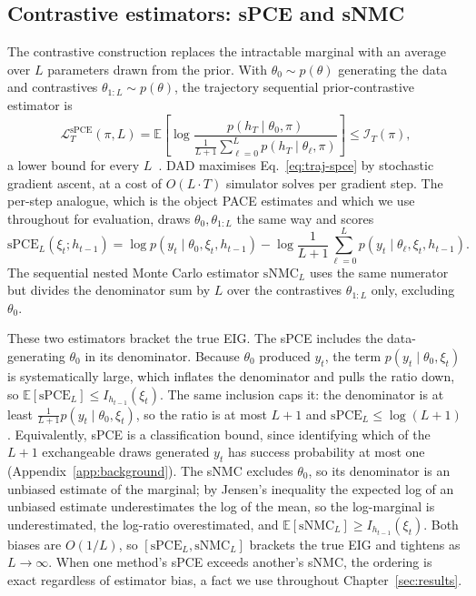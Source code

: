\subsection{Contrastive estimators: sPCE and sNMC}
\label{sec:m-contrastive}

The contrastive construction replaces the intractable marginal with an average over
$L$ parameters drawn from the prior. With $\theta_0\sim p(\theta)$ generating the
data and contrastives $\theta_{1:L}\sim p(\theta)$, the trajectory sequential
prior-contrastive estimator is
\begin{equation}
\label{eq:traj-spce}
\mathcal{L}_T^{\mathrm{sPCE}}(\pi,L)
=\mathbb{E}\!\left[\log\frac{p(h_T\mid\theta_0,\pi)}{\frac1{L+1}\sum_{\ell=0}^{L}p(h_T\mid\theta_\ell,\pi)}\right]
\le\mathcal{I}_T(\pi),
\end{equation}
a lower bound for every $L$~\citep{foster2021deep}. DAD maximises
Eq.~\eqref{eq:traj-spce} by stochastic gradient ascent, at a cost of $O(L\cdot T)$
simulator solves per gradient step. The per-step analogue, which is the object PACE
estimates and which we use throughout for evaluation, draws $\theta_0,\theta_{1:L}$
the same way and scores
\begin{equation}
\label{eq:spce}
\mathrm{sPCE}_L(\xi_t;h_{t-1})
= \log p(y_t\mid\theta_0,\xi_t,h_{t-1})
- \log\frac{1}{L+1}\sum_{\ell=0}^{L}p(y_t\mid\theta_\ell,\xi_t,h_{t-1}).
\end{equation}
The sequential nested Monte Carlo estimator $\mathrm{sNMC}_L$ uses the same numerator
but divides the denominator sum by $L$ over the contrastives $\theta_{1:L}$ only,
excluding $\theta_0$.

These two estimators bracket the true EIG. The sPCE includes the data-generating
$\theta_0$ in its denominator. Because $\theta_0$ produced $y_t$, the term
$p(y_t\mid\theta_0,\xi_t)$ is systematically large, which inflates the denominator
and pulls the ratio down, so $\mathbb{E}[\mathrm{sPCE}_L]\le I_{h_{t-1}}(\xi_t)$. The
same inclusion caps it: the denominator is at least
$\frac{1}{L+1}p(y_t\mid\theta_0,\xi_t)$, so the ratio is at most $L+1$ and
$\mathrm{sPCE}_L\le\log(L+1)$. Equivalently, sPCE is a classification bound, since
identifying which of the $L{+}1$ exchangeable draws generated $y_t$ has success
probability at most one (Appendix~\ref{app:background}). The sNMC excludes $\theta_0$,
so its denominator is an unbiased estimate of the marginal; by Jensen's inequality
the expected log of an unbiased estimate underestimates the log of the mean, so the
log-marginal is underestimated, the log-ratio overestimated, and
$\mathbb{E}[\mathrm{sNMC}_L]\ge I_{h_{t-1}}(\xi_t)$. Both biases are $O(1/L)$, so
$[\mathrm{sPCE}_L,\mathrm{sNMC}_L]$ brackets the true EIG and tightens as $L\to\infty$.
When one method's sPCE exceeds another's sNMC, the ordering is exact regardless of
estimator bias, a fact we use throughout Chapter~\ref{sec:results}.

